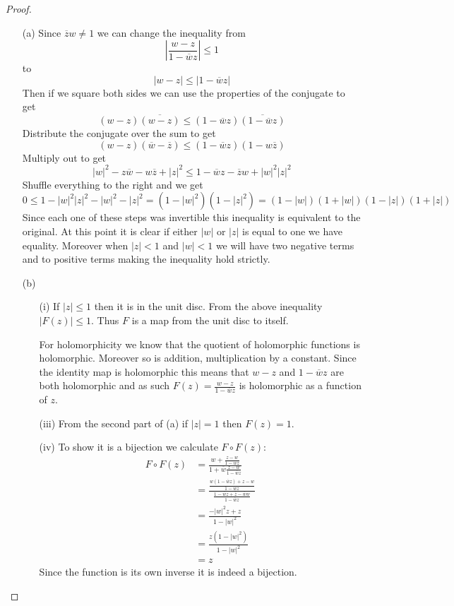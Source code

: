 \documentclass[10pt]{article}
\newcommand{\conj}[1]{\overline{#1}}
\theoremstyle{plain}
\theoremstyle{remark}
\begin{document}
\begin{proof}
  \begin{itemize}
  \item[(a)] Since $\conj{z}w\neq 1$ we can change the inequality from
    \[
      \left|
        \frac{w-z}{1-\conj{w}{z}}
      \right| \leq 1
    \]
    to
    \[
      |w-z|\leq |1-\conj{w}z|
    \]
    Then if we square both sides we can use the properties of the conjugate
    to get
    \[
      (w-z)\conj{(w-z)} \leq (1-\conj{w}z)\conj{(1-\conj{w}z)}
    \]
    Distribute the conjugate over the sum to get
    \[
      (w-z)(\conj{w}-\conj{z})\leq (1-\conj{w}z)(1-w\conj{z})
    \]
    Multiply out to get
    \[
      |w|^2-z\conj{w}-w\conj{z} + |z|^2\leq 1-\conj{w}z-\conj{z}w+|w|^2|z|^2
    \]
    Shuffle everything to the right and we get
    \[
      0 \leq 1-|w|^2|z|^2 -|w|^2-|z|^2 = (1-|w|^2)(1-|z|^2) = (1-|w|)(1+|w|)(1-|z|)(1+|z|)
    \]
    Since each one of these steps was invertible this inequality is equivalent
    to the original. At this point it is clear if either $|w|$ or $|z|$ is
    equal to one we have equality. Moreover when $|z|<1$ and $|w|<1$ we will
    have two negative terms and to positive terms making the inequality hold
    strictly.
  \item[(b)]
    \begin{itemize}
    \item[(i)] If $|z|\leq 1$ then  it is in the unit disc. From the above
      inequality $|F(z)|\leq 1$. Thus $F$ is a map from the unit disc to
      itself.

      For holomorphicity we know that the quotient of holomorphic functions is holomorphic.
      Moreover so is addition, multiplication by a constant. Since the identity map
      is holomorphic this means that $w-z$ and $1-\conj{w}z$ are both holomorphic and
      as such $F(z)=\frac{w-z}{1-\conj{w}z}$ is holomorphic as a function of $z$.
    \item[(iii)] From the second part of (a) if $|z|=1$ then $F(z)=1$.
    \item[(iv)] To show it is a bijection we calculate $F\circ F(z)$:
      \begin{align*}
        F\circ F(z) &= \frac{w+\frac{z-w}{1-\conj{w}z}}{1+\conj{w}\frac{z-w}{1-\conj{w}z}}\\
                &= \frac{\frac{w(1-\conj{w}z)+z-w}{1-\conj{w}z}}{\frac{1-\conj{w}z+\conj{z}-\conj{w}w}{1-\conj{w}z}}\\
                &= \frac{-|w|^2z+z}{1-|w|^2}\\
                &= \frac{z(1-|w|^2)}{1-|w|^2}\\
                &= z
      \end{align*}
      Since the function is its own inverse it is indeed a bijection.
    \end{itemize}
  \end{itemize}
\end{proof}
\end{document}
